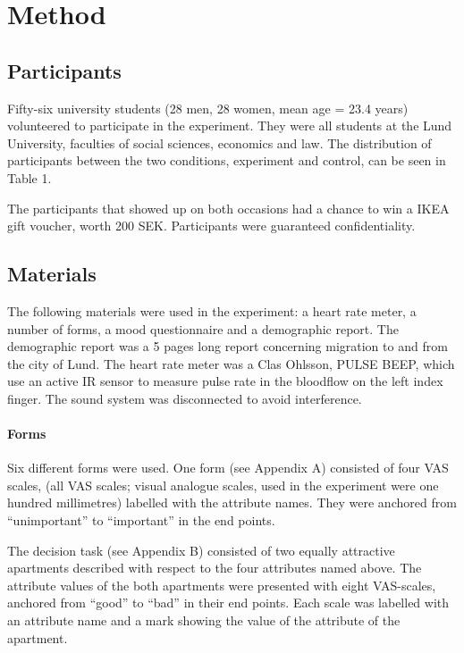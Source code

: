 \documentclass[jou,11pt]{apa6}
\begin{document}
\section{Method}

\subsection{Participants}

Fifty-six university students (28 men, 28 women, mean age = 23.4
years) volunteered to participate in the experiment.  They were all
students at the Lund University, faculties of social sciences,
economics and law.  The distribution of participants between the two
conditions, experiment and control, can be seen in Table 1.



The participants that showed up on both occasions had a chance to win
a IKEA gift voucher, worth 200 SEK.  Participants were guaranteed
confidentiality.


\subsection{Materials}

The following materials were used in the experiment: a heart rate
meter, a number of forms, a mood questionnaire and a demographic
report.  The demographic report was a 5 pages long report concerning
migration to and from the city of Lund.  The heart rate meter was a
Clas Ohlsson, PULSE BEEP, which use an active IR sensor to measure
pulse rate in the bloodflow on the left index finger.  The sound
system was disconnected to avoid interference.

\paragraph{Forms} Six different forms were used.  One form (see Appendix A)
consisted of four VAS scales, (all VAS scales; visual analogue scales,
used in the experiment were one hundred millimetres) labelled with the
attribute names.  They were anchored from ``unimportant'' to ``important''
in the end points.

The decision task (see Appendix B) consisted of two equally attractive
apartments described with respect to the four attributes named above.
The attribute values of the both apartments were presented with eight
VAS-scales, anchored from ``good'' to ``bad'' in their end points.  Each
scale was labelled with an attribute name and a mark showing the value
of the attribute of the apartment.
\end{document}
